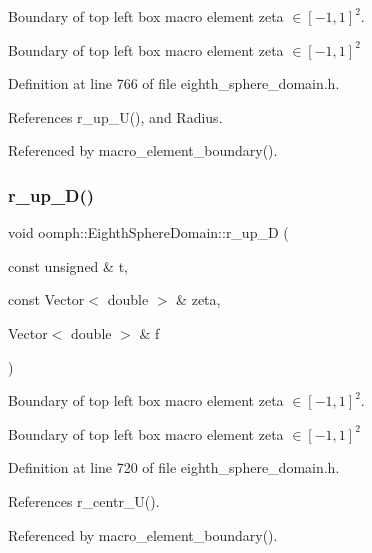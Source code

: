 Boundary of top left box macro element zeta $ \in [-1,1]^2 $. 

Boundary of top left box macro element zeta $ \in [-1,1]^2 $ 

Definition at line 766 of file eighth\+\_\+sphere\+\_\+domain.\+h.



References r\+\_\+up\+\_\+\+U(), and Radius.



Referenced by macro\+\_\+element\+\_\+boundary().

\mbox{\label{classoomph_1_1EighthSphereDomain_ad55bde69a74b24f1c9c6cc6bb277e39b}} 
\subsubsection{\texorpdfstring{r\+\_\+up\+\_\+\+D()}{r\_up\_D()}}
{\footnotesize\ttfamily void oomph\+::\+Eighth\+Sphere\+Domain\+::r\+\_\+up\+\_\+D (\begin{DoxyParamCaption}\item[{const unsigned \&}]{t,  }\item[{const Vector$<$ double $>$ \&}]{zeta,  }\item[{Vector$<$ double $>$ \&}]{f }\end{DoxyParamCaption})\hspace{0.3cm}{\ttfamily [private]}}



Boundary of top left box macro element zeta $ \in [-1,1]^2 $. 

Boundary of top left box macro element zeta $ \in [-1,1]^2 $ 

Definition at line 720 of file eighth\+\_\+sphere\+\_\+domain.\+h.



References r\+\_\+centr\+\_\+\+U().



Referenced by macro\+\_\+element\+\_\+boundary().

\mbox{\label{classoomph_1_1EighthSphereDomain_a9e419235f4800eab872523bdbfe72fb6}} 
